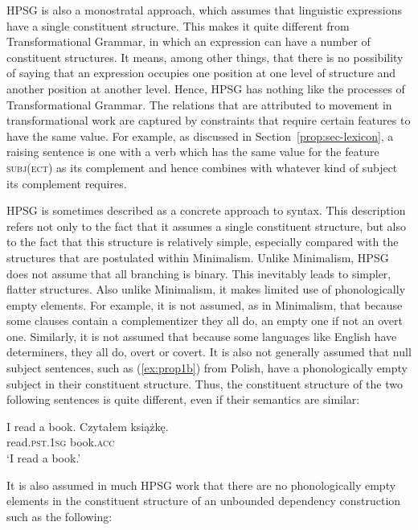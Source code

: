 \documentclass[output=paper
	        ,collection
	        ,collectionchapter
 	        ,biblatex
                ,babelshorthands
                ,newtxmath
                ,draftmode
                ,colorlinks, citecolor=brown
]{langscibook}
\begin{document}
HPSG is also a monostratal approach, which assumes that linguistic expressions have a single constituent structure. This makes it quite different from Transformational Grammar, in which an expression can have a number of constituent structures. It means, among other things, that there is no possibility of saying that an expression occupies one position at one level of structure and another position at another level. Hence, HPSG has nothing like the  processes of Transformational Grammar. The relations that are attributed to movement in transformational work are captured by constraints that require certain features to have the same value. For example, as discussed in Section~\ref{prop:sec-lexicon}, a raising sentence is one with a verb which has the same value for the feature \textsc{subj(ect)} as its complement and hence combines with whatever kind of subject its complement requires.

HPSG is sometimes described as a concrete approach to syntax. This description refers not only to
the fact that it assumes a single constituent structure, but also to the fact that this structure is
relatively simple, especially compared with the structures that are postulated within
Minimalism\indexmp. Unlike Minimalism, HPSG does not assume that all branching
is binary. This inevitably leads to simpler, flatter structures. Also unlike Minimalism, it makes
limited use of phonologically empty elements. For example, it is not assumed, as in Minimalism, that
because some clauses contain a complementizer they all do, an empty one if not an overt
one. Similarly, it is not assumed that because some languages like English have determiners, they
all do, overt or covert. It is also not generally assumed that null subject sentences, such as
(\ref{ex:prop1b}) from Polish, have a phonologically empty subject in their constituent
structure. Thus, the constituent structure of the two following sentences is quite different, even
if their semantics are similar:

\eal\label{ex:prop1}
\ex\label{ex:prop1a}
I read a book.
\ex\label{ex:prop1b}
\gll Czytałem książkę.\\
     read\textsc{.pst.1sg} book\textsc{.acc}\\
\glt `I read a book.'
\zl

\noindent
It is also assumed in much HPSG work that there are no phonologically empty elements in the
constituent structure of an unbounded dependency construction such as the following:
\end{document}

